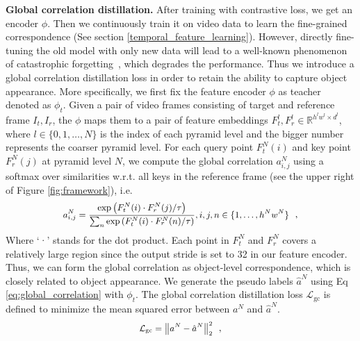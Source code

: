 \documentclass{article}
\begin{document}
\textbf{Global correlation distillation.} After training with contrastive loss, we get an encoder $\phi$. Then we continuously train it on video data to learn the fine-grained correspondence (See section \ref{temporal_feature_learning}). However, directly fine-tuning the old model with only new data will lead to a well-known phenomenon of catastrophic forgetting~\cite{li2017learning}, which degrades the performance. Thus we introduce a global correlation distillation loss in order to retain the ability to capture object appearance. More specifically, we first fix the feature encoder $\phi$ as teacher denoted as $\phi_t$. Given a pair of video frames consisting of target and reference frame $I_{t}, I_r$, the  $\phi$ maps them to a pair of feature embeddings $F^l_t,F^l_{r} \in \mathbb{R}^{h^l w^l \times d^l}$, where $l \in \{0, 1, \ldots, N \}$ is the index of each pyramid level and the bigger number represents the coarser pyramid level. For each query point $F^N_t(i)$ and key point $F^N_r(j)$ at pyramid level $N$, we compute the global correlation $a^N_{i, j}$ using a softmax over similarities w.r.t. all keys in the reference frame (see the upper right of Figure \ref{fig:framework}), i.e.
\begin{equation}\label{eq:global_correlation}
  \small
  \begin{aligned}
    a^N_{i, j}=\frac{\exp \left(F^N_t(i)  \cdot F^N_r(j) / \tau\right)}{\sum_{n} \exp \left(F^N_t(i) \cdot F^N_r(n) / \tau\right)}, i,j,n \in \{1,\ldots,h^Nw^N\}
  \end{aligned}~~,
\end{equation}
Where ‘·’ stands for the dot product. Each point in $F^N_t$ and $F^N_{r}$ covers a relatively large region since the output stride is set to 32 in our feature encoder. Thus, we can form the global correlation as object-level correspondence, which is closely related to object appearance. We generate the pseudo labels $\hat{a}^N$  using Eq \ref{eq:global_correlation} with $\phi_t$. The global correlation distillation loss $\mathcal{L}_{\mathrm{gc}}$ is defined to minimize the mean squared error between $a^N$ and $\hat{a}^N$.
\begin{equation}\label{eq:global_correlation_loss}
  \small
  \begin{aligned}
    \mathcal{L}_{\mathrm{gc}}  = \left\|a^N-\hat{a}^N\right\|_{2}^{2}
  \end{aligned}~~,
\end{equation}
\end{document}
